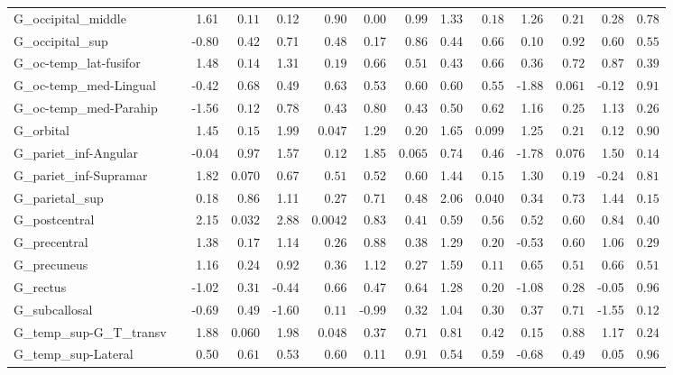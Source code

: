 {\begin{longtable}{llrrrrrrrrrrrr}
G\_occipital\_middle &  & 1.61 & $0.11$ & 0.12 & $0.90$ & 0.00 & $0.99$ & 1.33 & $0.18$ & 1.26 & $0.21$ & 0.28 & $0.78$ \\
G\_occipital\_sup &  & -0.80 & $0.42$ & 0.71 & $0.48$ & 0.17 & $0.86$ & 0.44 & $0.66$ & 0.10 & $0.92$ & 0.60 & $0.55$ \\
G\_oc-temp\_lat-fusifor &  & 1.48 & $0.14$ & 1.31 & $0.19$ & 0.66 & $0.51$ & 0.43 & $0.66$ & 0.36 & $0.72$ & 0.87 & $0.39$ \\
G\_oc-temp\_med-Lingual &  & -0.42 & $0.68$ & 0.49 & $0.63$ & 0.53 & $0.60$ & 0.60 & $0.55$ & -1.88 & $0.061$ & -0.12 & $0.91$ \\
G\_oc-temp\_med-Parahip &  & -1.56 & $0.12$ & 0.78 & $0.43$ & 0.80 & $0.43$ & 0.50 & $0.62$ & 1.16 & $0.25$ & 1.13 & $0.26$ \\
G\_orbital &  & 1.45 & $0.15$ & 1.99 & $0.047$ & 1.29 & $0.20$ & 1.65 & $0.099$ & 1.25 & $0.21$ & 0.12 & $0.90$ \\
G\_pariet\_inf-Angular &  & -0.04 & $0.97$ & 1.57 & $0.12$ & 1.85 & $0.065$ & 0.74 & $0.46$ & -1.78 & $0.076$ & 1.50 & $0.14$ \\
G\_pariet\_inf-Supramar &  & 1.82 & $0.070$ & 0.67 & $0.51$ & 0.52 & $0.60$ & 1.44 & $0.15$ & 1.30 & $0.19$ & -0.24 & $0.81$ \\
G\_parietal\_sup &  & 0.18 & $0.86$ & 1.11 & $0.27$ & 0.71 & $0.48$ & 2.06 & $0.040$ & 0.34 & $0.73$ & 1.44 & $0.15$ \\
G\_postcentral &  & 2.15 & $0.032$ & 2.88 & $0.0042$ & 0.83 & $0.41$ & 0.59 & $0.56$ & 0.52 & $0.60$ & 0.84 & $0.40$ \\
G\_precentral &  & 1.38 & $0.17$ & 1.14 & $0.26$ & 0.88 & $0.38$ & 1.29 & $0.20$ & -0.53 & $0.60$ & 1.06 & $0.29$ \\
G\_precuneus &  & 1.16 & $0.24$ & 0.92 & $0.36$ & 1.12 & $0.27$ & 1.59 & $0.11$ & 0.65 & $0.51$ & 0.66 & $0.51$ \\
G\_rectus &  & -1.02 & $0.31$ & -0.44 & $0.66$ & 0.47 & $0.64$ & 1.28 & $0.20$ & -1.08 & $0.28$ & -0.05 & $0.96$ \\
G\_subcallosal &  & -0.69 & $0.49$ & -1.60 & $0.11$ & -0.99 & $0.32$ & 1.04 & $0.30$ & 0.37 & $0.71$ & -1.55 & $0.12$ \\
G\_temp\_sup-G\_T\_transv &  & 1.88 & $0.060$ & 1.98 & $0.048$ & 0.37 & $0.71$ & 0.81 & $0.42$ & 0.15 & $0.88$ & 1.17 & $0.24$ \\
G\_temp\_sup-Lateral &  & 0.50 & $0.61$ & 0.53 & $0.60$ & 0.11 & $0.91$ & 0.54 & $0.59$ & -0.68 & $0.49$ & 0.05 & $0.96$ \\

\end{longtable}}
